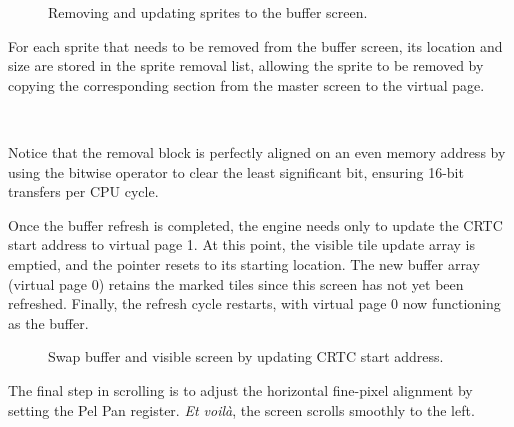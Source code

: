 \documentclass[book.tex]{subfiles}
\begin{document}
\begin{figure}[H]
\centering
 \caption{Removing and updating sprites to the buffer screen.}
 \label{fig:kc4_6_step4}
\end{figure}

\par
For each sprite that needs to be removed from the buffer screen, its location and size are stored in the sprite removal list, allowing the sprite to be removed by copying the corresponding section from the master screen to the virtual page.\\
\par
\begin{minipage}{\textwidth}
  
  \end{minipage}
  \label{block_removal}
\\


\par
Notice that the removal block is perfectly aligned on an even memory address by using the  bitwise operator to clear the least significant bit, ensuring 16-bit transfers per CPU cycle.\\

\par
\begin{minipage}{\textwidth}
  
  \end{minipage}
  \label{block_removal}


  


\pagebreak
Once the buffer refresh is completed, the engine needs only to update the CRTC start address to virtual page 1. At this point, the visible tile update array is emptied, and the pointer resets to its starting location. The new buffer array (virtual page 0) retains the marked tiles since this screen has not yet been refreshed. Finally, the refresh cycle restarts, with virtual page 0 now functioning as the buffer. 

\begin{figure}[H]
\centering
 \caption{Swap buffer and visible screen by updating CRTC start address.}
 \label{fig:kc4_6_step4}
\end{figure}

\pagebreak
The final step in scrolling is to adjust the horizontal fine-pixel alignment by setting the Pel Pan register. \textit{Et voil\`a}, the screen scrolls smoothly to the left.\\
\end{document}
